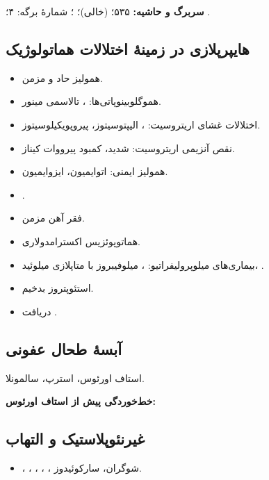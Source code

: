 \documentclass[12pt,a4paper]{article}
\begin{document}
\textbf{سربرگ و حاشیه:} ۵۳۵؛  (خالی)؛ ؛ شمارهٔ برگه: ۴؛ .
\subsection*{هایپرپلازی در زمینهٔ اختلالات هماتولوژیک}
\begin{itemize}
\item همولیز حاد و مزمن.
\item هموگلوبینوپاتی‌ها: ، تالاسمی مینور.
\item اختلالات غشای اریتروسیت: ، الیپتوسیتوز، پیروپویکیلوسیتوز.
\item نقص آنزیمی اریتروسیت:  شدید، کمبود پیرووات کیناز.
\item همولیز ایمنی: اتوایمیون، ایزوایمیون.
\item {}.
\item فقر آهن مزمن.
\item هماتوپوئزیس اکسترامدولاری.
\item بیماری‌های میلوپرولیفراتیو: ، میلوفیبروز با متاپلازی میلوئید، .
\item استئوپتروز بدخیم.
\item دریافت .
\end{itemize}

\subsection*{آبسهٔ طحال عفونی}
استاف اورئوس، استرپ، سالمونلا.

\textbf{خط‌خوردگی پیش از استاف اورئوس:} 

\subsection*{غیرنئوپلاستیک و التهاب}
\begin{itemize}
\item {}، ، ، ، ، شوگران، سارکوئیدوز.
\end{itemize}
\end{document}
